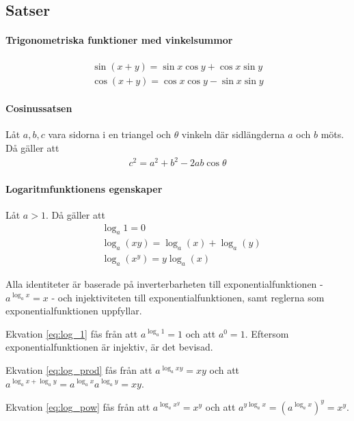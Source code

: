 \subsection{Satser}

\paragraph{Trigonometriska funktioner med vinkelsummor}
\begin{align*}
	\sin\left(x+y\right) = \sin x\cos y + \cos x\sin y\\
	\cos\left(x+y\right) = \cos x\cos y - \sin x\sin y
\end{align*}

\paragraph{Cosinussatsen}

Låt $a,b,c$ vara sidorna i en triangel och $\theta$ vinkeln där sidlängderna $a$ och $b$ möts. Då gäller att
\begin{align*}
	c^2=a^2+b^2-2ab\cos\theta
\end{align*}

\paragraph{Logaritmfunktionens egenskaper}

Låt $a > 1$. Då gäller att
\begin{align}
	&\log_a 1 = 0 \label{eq:log_1}\\
	&\log_a\left(xy\right) = \log_a\left(x\right) + \log_a\left(y\right) \label{eq:log_prod}\\
	&\log_a\left(x^y\right) = y\log_a\left(x\right) \label{eq:log_pow}
\end{align}

\proof
Alla identiteter är baserade på inverterbarheten till exponentialfunktionen - $a^{\log_a x} = x$ - och injektiviteten till exponentialfunktionen, samt reglerna som exponentialfunktionen uppfyllar.

Ekvation \ref{eq:log_1} fås från att $a^{\log_a 1} = 1$ och att $a^0 = 1$. Eftersom exponentialfunktionen är injektiv, är det bevisad.

Ekvation \ref{eq:log_prod} fås från att $a^{\log_a xy} = xy$ och att $a^{\log_a x + \log_a y} = a^{\log_a x}a^{\log_a y}=xy$.

Ekvation \ref{eq:log_pow} fås från att $a^{\log_a x^y} = x^y$ och att $a^{y\log_a x} = \left(a^{\log_a x}\right)^y = x^y$.


